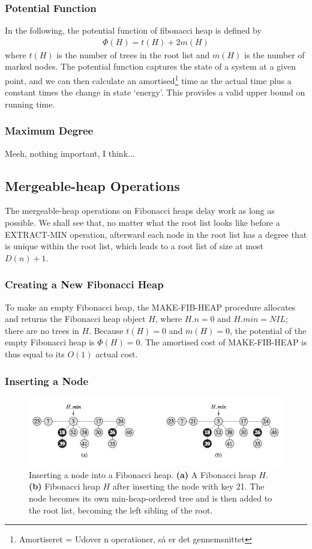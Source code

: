 \subsubsection{Potential Function}
In the following, the potential function of fibonacci heap is defined by
\begin{align}
	\Phi(H) = t(H) + 2m(H)
\end{align}
where $t(H)$ is the number of trees in the root list and $m(H)$ is the number of marked nodes. The potential function captures the state of a system at a given point, and we can then calculate an amortised\footnote{Amortiseret = Udover n operationer, så er det gennemsnittet} time as the actual time plus a constant times the change in state ‘energy’. This provides a valid upper bound on running time.

\subsubsection{Maximum Degree}
Meeh, nothing important, I think... 

\subsection{Mergeable-heap Operations}
The mergeable-heap operations on Fibonacci heaps delay work as long as possible. We shall see that, no matter what the root list looks like before a EXTRACT-MIN operation, afterward each node in the root list has a degree that is unique within the root list, which leads to a root list of size at most $D(n) + 1$. 
%
\subsubsection{Creating a New Fibonacci Heap}
To make an empty Fibonacci heap, the MAKE-FIB-HEAP procedure allocates and returns the Fibonacci heap object $H$, where $H.n = 0$ and $H.min = NIL$; there are no trees in $H$. Because $t(H) = 0$ and $m(H) = 0$, the potential of the empty Fibonacci heap is $\Phi(H) = 0$. The amortised cost of MAKE-FIB-HEAP is thus equal to its $O(1)$ actual cost.
%
\subsubsection{Inserting a Node}
\begin{figure} [H]
    \begin{center}
        \includegraphics[width=\textwidth]{Images/InsertFib.png}
        \caption{\footnotesize{Inserting a node into a Fibonacci heap. \textbf{(a)} A Fibonacci heap $H$. \textbf{(b)} Fibonacci heap $H$ after inserting the node with key 21. The node becomes its own min-heap-ordered tree and is then added to the root list, becoming the left sibling of the root.}}
    \end{center}
\end{figure}

